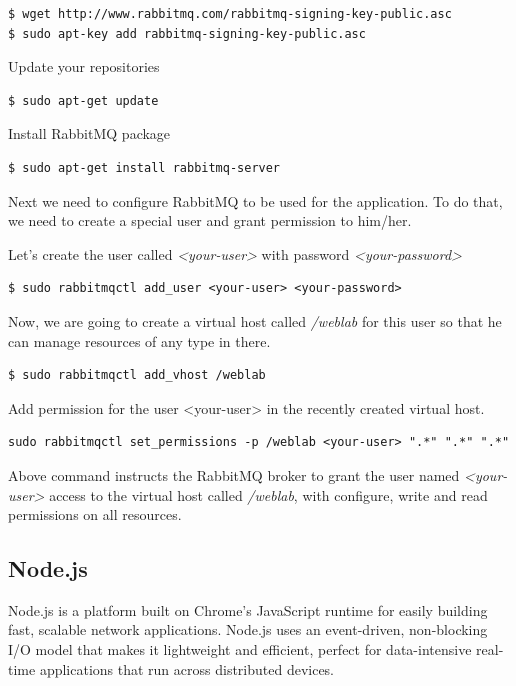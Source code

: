 \documentclass{article}
\begin{document}
\begin{verbatim}
$ wget http://www.rabbitmq.com/rabbitmq-signing-key-public.asc
$ sudo apt-key add rabbitmq-signing-key-public.asc
\end{verbatim}

Update your repositories
\begin{verbatim}
$ sudo apt-get update
\end{verbatim}

Install RabbitMQ package
\begin{verbatim}
$ sudo apt-get install rabbitmq-server
\end{verbatim}

Next we need to configure RabbitMQ to be used for the application. To do that, we need to create a special user and grant permission to him/her.

Let's create the user called \textit{<your-user>} with password \textit{<your-password>}

\begin{verbatim}
$ sudo rabbitmqctl add_user <your-user> <your-password>
\end{verbatim}

Now, we are going to create a virtual host  called \textit{/weblab} for this user so that he can manage resources of any type in there.

\begin{verbatim}
$ sudo rabbitmqctl add_vhost /weblab
\end{verbatim}

Add permission for the user <your-user> in the recently created virtual host.

\begin{verbatim}
sudo rabbitmqctl set_permissions -p /weblab <your-user> ".*" ".*" ".*"
\end{verbatim}

Above command instructs the RabbitMQ broker to grant the user named \textit{<your-user>} access to the virtual host called \textit{/weblab}, with configure, write and read permissions on all resources.

\subsection{Node.js}

Node.js is a platform built on Chrome's JavaScript runtime for easily building fast, scalable network applications. Node.js uses an event-driven, non-blocking I/O model that makes it lightweight and efficient, perfect for data-intensive real-time applications that run across distributed devices.
\end{document}
